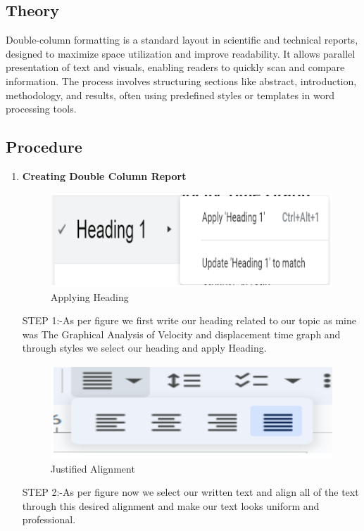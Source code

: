 \documentclass[a4paper,9pt]{article}
\begin{document}
\subsection{Theory}
Double-column formatting is a standard layout in scientific and technical reports, designed to maximize space utilization and improve readability. It allows parallel presentation of text and visuals, enabling readers to quickly scan and compare information. The process involves structuring sections like abstract, introduction, methodology, and results, often using predefined styles or templates in word processing tools.
\setcounter{figure}{0}

\subsection{Procedure}
\begin{enumerate}
	\item \textbf{Creating Double Column Report}
	
	\begin{figure}[H]
		\centering
		\includegraphics[width=0.8\linewidth]{2.1.png}
		\caption{Applying Heading}
	\end{figure}
	STEP 1:-As per figure we first write our heading related to our topic as mine was
	The Graphical Analysis of Velocity and displacement time graph and through
	styles we select our heading and apply Heading.
	\begin{figure}[H]
		\centering
		\includegraphics[width=0.8\linewidth]{2.2.png}
		\caption{Justified Alignment}
	\end{figure}
	STEP 2:-As per figure now we select our written text and align all of the text through
	this desired alignment and make our text looks uniform and professional.
	

\end{enumerate}
\end{document}
